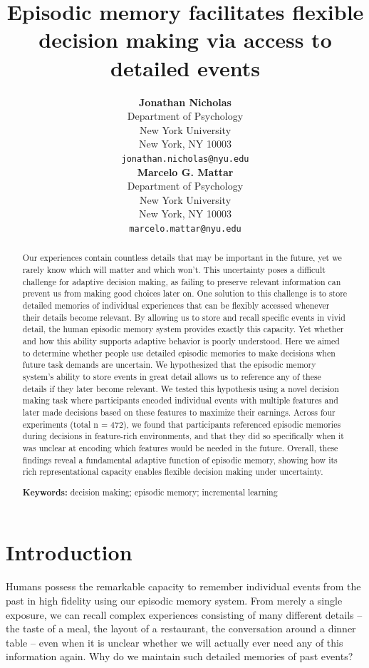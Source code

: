 \documentclass[10pt,letterpaper]{article}
\title{Episodic memory facilitates flexible decision making via access to detailed events}
\author{
{\large \bf Jonathan Nicholas} \\
Department of Psychology \\
New York University \\
New York, NY 10003 \\
\texttt{jonathan.nicholas@nyu.edu} \\
\And
{\large \bf Marcelo G. Mattar} \\
Department of Psychology \\
New York University \\
New York, NY 10003 \\
\texttt{marcelo.mattar@nyu.edu}
}
\begin{document}
\maketitle

\begin{abstract}

Our experiences contain countless details that may be important in the future, yet we rarely know which will matter and which won't. This uncertainty poses a difficult challenge for adaptive decision making, as failing to preserve relevant information can prevent us from making good choices later on. One solution to this challenge is to store detailed memories of individual experiences that can be flexibly accessed whenever their details become relevant. By allowing us to store and recall specific events in vivid detail, the human episodic memory system provides exactly this capacity. Yet whether and how this ability supports adaptive behavior is poorly understood. Here we aimed to determine whether people use detailed episodic memories to make decisions when future task demands are uncertain. We hypothesized that the episodic memory system's ability to store events in great detail allows us to reference any of these details if they later become relevant. We tested this hypothesis using a novel decision making task where participants encoded individual events with multiple features and later made decisions based on these features to maximize their earnings. Across four experiments (total n = 472), we found that participants referenced episodic memories during decisions in feature-rich environments, and that they did so specifically when it was unclear at encoding which features would be needed in the future. Overall, these findings reveal a fundamental adaptive function of episodic memory, showing how its rich representational capacity enables flexible decision making under uncertainty.

\textbf{Keywords:} 
decision making; episodic memory; incremental learning

\end{abstract}

\section{Introduction}

Humans possess the remarkable capacity to remember individual events from the past in high fidelity using our episodic memory system\cite{tulvingEpisodicSemanticMemory1972, eichenbaumHippocampusMechanismsDeclarative1999}. From merely a single exposure, we can recall complex experiences consisting of many different details -- the taste of a meal, the layout of a restaurant, the conversation around a dinner table -- even when it is unclear whether we will actually ever need any of this information again. Why do we maintain such detailed memories of past events?
\end{document}
